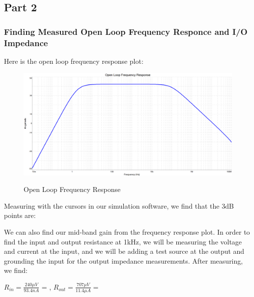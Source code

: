 \documentclass[12pt]{article}
\begin{document}
\subsection{Part 2}
\subsubsection{Finding Measured Open Loop Frequency Responce and I/O Impedance}
Here is the open loop frequency response plot:
\begin{figure}[h!]
    \centering
    \includegraphics[height=0.45\textwidth]{Images/partCbode.png}\\
    \caption{Open Loop Frequency Response}
    \label{fig:olfreqresponse}
\end{figure}
\FloatBarrier
Measuring with the cursors in our simulation software, we find that the 
3dB points are: 
\begin{center}
\end{center}
We can also find our mid-band gain  from the frequency 
response plot.
In order to find the input and output resistance at 1kHz, we will be measuring the voltage 
and current at the input, and we will be adding a test source at the output and grounding the
input for the output impedance measurements. After measuring, we find: 
\begin{center}
$R_{in} = \frac{240\mu V}{93.4nA}$ = , 
$R_{out} = \frac{707\mu V}{11.4 \mu A} = $ \boxed{62.017\Omega}
\end{center}
\end{document}
